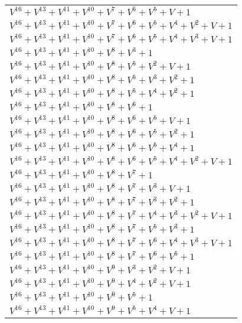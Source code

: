 \documentclass[12pt]{article}
\begin{document}
\begin{adjustwidth}{-4cm}{}
\begin{center}
\begin{longtable}{|l|}
$V^{16}  +V^{13}  +V^{11}  +V^{10}  +V^{7}  +V^{6}  +V^{5}  + V + 1$ \\
$V^{16}  +V^{13}  +V^{11}  +V^{10}  +V^{7}  +V^{6}  +V^{5}  +V^{4}  +V^{2}  + V + 1$ \\
$V^{16}  +V^{13}  +V^{11}  +V^{10}  +V^{7}  +V^{6}  +V^{5}  +V^{4}  +V^{3}  + V + 1$ \\
$V^{16}  +V^{13}  +V^{11}  +V^{10}  +V^{8}  +V^{3}  + 1$ \\
$V^{16}  +V^{13}  +V^{11}  +V^{10}  +V^{8}  +V^{5}  +V^{2}  + V + 1$ \\
$V^{16}  +V^{13}  +V^{11}  +V^{10}  +V^{8}  +V^{5}  +V^{3}  +V^{2}  + 1$ \\
$V^{16}  +V^{13}  +V^{11}  +V^{10}  +V^{8}  +V^{5}  +V^{4}  +V^{2}  + 1$ \\
$V^{16}  +V^{13}  +V^{11}  +V^{10}  +V^{8}  +V^{6}  + 1$ \\
$V^{16}  +V^{13}  +V^{11}  +V^{10}  +V^{8}  +V^{6}  +V^{5}  + V + 1$ \\
$V^{16}  +V^{13}  +V^{11}  +V^{10}  +V^{8}  +V^{6}  +V^{5}  +V^{2}  + 1$ \\
$V^{16}  +V^{13}  +V^{11}  +V^{10}  +V^{8}  +V^{6}  +V^{5}  +V^{4}  + 1$ \\
$V^{16}  +V^{13}  +V^{11}  +V^{10}  +V^{8}  +V^{6}  +V^{5}  +V^{4}  +V^{2}  + V + 1$ \\
$V^{16}  +V^{13}  +V^{11}  +V^{10}  +V^{8}  +V^{7}  + 1$ \\
$V^{16}  +V^{13}  +V^{11}  +V^{10}  +V^{8}  +V^{7}  +V^{3}  + V + 1$ \\
$V^{16}  +V^{13}  +V^{11}  +V^{10}  +V^{8}  +V^{7}  +V^{3}  +V^{2}  + 1$ \\
$V^{16}  +V^{13}  +V^{11}  +V^{10}  +V^{8}  +V^{7}  +V^{4}  +V^{3}  +V^{2}  + V + 1$ \\
$V^{16}  +V^{13}  +V^{11}  +V^{10}  +V^{8}  +V^{7}  +V^{5}  +V^{3}  + 1$ \\
$V^{16}  +V^{13}  +V^{11}  +V^{10}  +V^{8}  +V^{7}  +V^{6}  +V^{4}  +V^{3}  + V + 1$ \\
$V^{16}  +V^{13}  +V^{11}  +V^{10}  +V^{8}  +V^{7}  +V^{6}  +V^{5}  + 1$ \\
$V^{16}  +V^{13}  +V^{11}  +V^{10}  +V^{9}  +V^{3}  +V^{2}  + V + 1$ \\
$V^{16}  +V^{13}  +V^{11}  +V^{10}  +V^{9}  +V^{4}  +V^{2}  + V + 1$ \\
$V^{16}  +V^{13}  +V^{11}  +V^{10}  +V^{9}  +V^{5}  + 1$ \\
$V^{16}  +V^{13}  +V^{11}  +V^{10}  +V^{9}  +V^{5}  +V^{4}  + V + 1$ \\

\end{longtable}
\end{center}
\end{adjustwidth}
\end{document}
